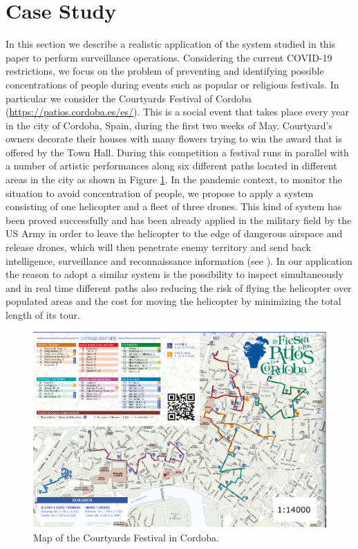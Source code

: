 \section{Case Study}

\noindent
In this section we describe a realistic application of the system studied in this paper to perform surveillance operations. Considering the current COVID-19 restrictions, we focus on the problem of preventing and identifying possible concentrations of people during events such as popular or religious festivals. In particular we consider the Courtyards Festival of Cordoba (\url{https://patios.cordoba.es/es/}). This is a social event that takes place every year in the city of Cordoba, Spain, during the first two weeks of May. Courtyard’s owners decorate their houses with many flowers trying to win the award that is offered by the Town Hall. During this competition a festival runs in parallel with a number of artistic performances along six different paths located in different areas in the city as shown in Figure \ref{fig:mapPF}.
In the pandemic context, to monitor the situation to avoid concentration of people, we propose to apply a system consisting of one helicopter and a fleet of three drones.
This kind of system has been proved successfully and has been already applied in the military field by the US Army in order to leave the helicopter to the edge of dangerous airspace and release drones, which will then penetrate enemy territory and send back intelligence, surveillance and reconnaissance information (see \cite{FG}).
In our application the reason to adopt a similar system is the possibility to inspect simultaneously and in real time different paths also reducing the risk of flying the helicopter over populated areas and the cost for moving the helicopter by minimizing the total length of its tour.

\begin{figure}[h!]
\centering
\includegraphics[width=0.6\linewidth]{figures/first.png}
\caption{Map of the Courtyards Festival in Cordoba. \label{fig:mapPF}}
\end{figure}

